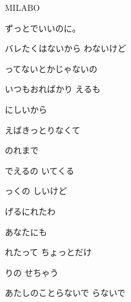 \documentclass[a4paper,tate,twocolumn,12pt]{ltjtarticle}
\begin{document}
\thispagestyle{empty}

\begin{center}
{\LARGE MILABO}

{\large ずっとでいいのに。}
\end{center}

\vspace{1em}

\begin{flushleft}

\noindent\begin{minipage}{\linewidth}
バレたくはないから わないけど

ってないとかじゃないの

いつもおればかり えるも

にしいから
\end{minipage}

\vspace{2em}

\noindent\begin{minipage}{\linewidth}
えばきっとりなくて

のれまで

でえるの いてくる

っくの しいけど

げるにれたわ
\end{minipage}

\vspace{2em}

\noindent\begin{minipage}{\linewidth}
あなたにも

れたって ちょっとだけ 

りの せちゃう
\end{minipage}

\vspace{2em}

\noindent\begin{minipage}{\linewidth}
あたしのことらないで らないで


\end{minipage}
\end{flushleft}
\end{document}
